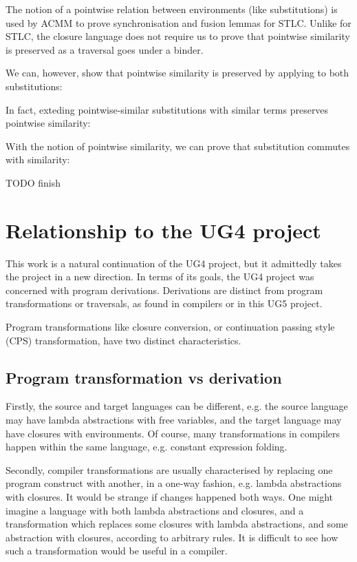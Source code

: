 \documentclass[bsc,frontabs,twoside,singlespacing,parskip,deptreport]{infthesis}
\theoremstyle{definition}
\begin{document}
The notion of a pointwise relation between environments (like
substitutions) is used by ACMM to prove synchronisation and fusion
lemmas for STLC. Unlike for STLC, the closure language \lcl does not
require us to prove that pointwise similarity is preserved as a
traversal goes under a binder.

We can, however, show that pointwise similarity is preserved by
applying  to both substitutions:


In fact, exteding pointwise-similar substitutions with similar terms
preserves pointwise similarity:


With the notion of pointwise similarity, we can prove that
substitution commutes with similarity:


TODO finish

\chapter{Relationship to the UG4 project}

This work is a natural continuation of the UG4 project, but it
admittedly takes the project in a new direction. In terms of its
goals, the UG4 project was concerned with program
derivations. Derivations are distinct from program transformations or
traversals, as found in compilers or in this UG5 project.

Program transformations like closure conversion, or continuation
passing style (CPS) transformation, have two distinct characteristics.

\section{Program transformation vs derivation}
\label{sec:progr-transf-vs}

Firstly, the source and target languages can be different, e.g. the
source language may have lambda abstractions with free variables, and
the target language may have closures with environments. Of course,
many transformations in compilers happen within the same language,
e.g. constant expression folding.

Secondly, compiler transformations are usually characterised by
replacing one program construct with another, in a one-way fashion,
e.g. lambda abstractions with closures. It would be strange if changes
happened both ways. One might imagine a language with both lambda
abstractions and closures, and a transformation which replaces some
closures with lambda abstractions, and some abstraction with closures,
according to arbitrary rules. It is difficult to see how such a
transformation would be useful in a compiler.
\end{document}
